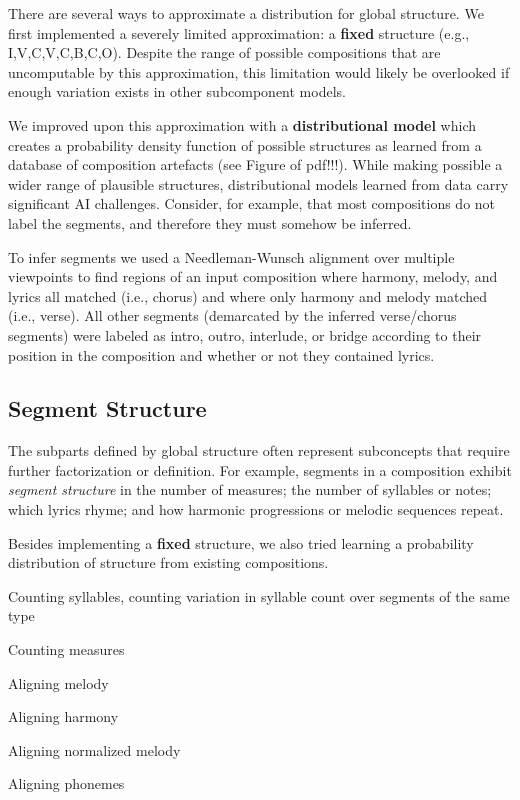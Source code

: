 \documentclass[letterpaper]{article}
\begin{document}
There are several ways to approximate a distribution for global structure. We first implemented a severely limited approximation: a \textbf{fixed} structure (e.g., I,V,C,V,C,B,C,O). Despite the range of possible compositions that are uncomputable by this approximation, this limitation would likely be overlooked if enough variation exists in other subcomponent models.

We improved upon this approximation with a \textbf{distributional model} which creates a probability density function of possible structures as learned from a database of composition artefacts (see Figure of pdf!!!). While making possible a wider range of plausible structures, distributional models learned from data carry significant AI challenges. Consider, for example, that most compositions do not label the segments, and therefore they must somehow be inferred.

To infer segments we used a Needleman-Wunsch alignment over multiple viewpoints to find regions of an input composition where harmony, melody, and lyrics all matched (i.e., chorus) and where only harmony and melody matched (i.e., verse). All other segments (demarcated by the inferred verse/chorus segments) were labeled as intro, outro, interlude, or bridge according to their position in the composition and whether or not they contained lyrics.

\subsection{Segment Structure}

The subparts defined by global structure often represent subconcepts that require further factorization or definition. For example, segments in a composition exhibit \textit{segment structure} in the number of measures; the number of syllables or notes; which lyrics rhyme; and how harmonic progressions or melodic sequences repeat. 

Besides implementing a \textbf{fixed} structure, we also tried learning a probability distribution of structure from existing compositions. 

Counting syllables, counting variation in syllable count over segments of the same type

Counting measures

Aligning melody

Aligning harmony

Aligning normalized melody

Aligning phonemes
\end{document}

